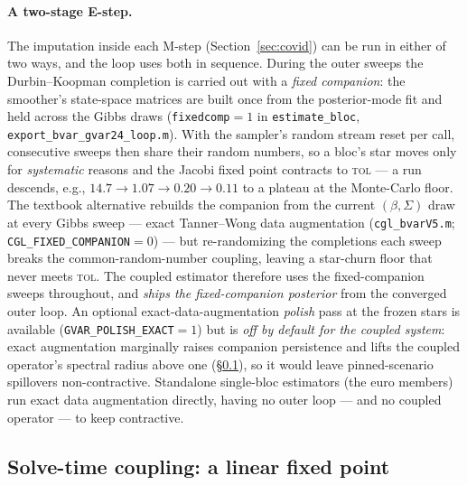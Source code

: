 \documentclass[11pt]{article}
\theoremstyle{plain}
\theoremstyle{remark}
\begin{document}
\paragraph{A two-stage E-step.} The imputation inside each M-step
(Section~\ref{sec:covid}) can be run in either of two ways, and the loop
uses both in sequence. During the outer sweeps the Durbin--Koopman
completion is carried out with a \emph{fixed companion}: the smoother's
state-space matrices are built once from the posterior-mode fit and held
across the Gibbs draws (\texttt{fixedcomp}$=1$ in
\texttt{estimate\_bloc}, \texttt{export\_bvar\_gvar24\_loop.m}). With the
sampler's random stream reset per call, consecutive sweeps then share
their random numbers, so a bloc's star moves only for \emph{systematic}
reasons and the Jacobi fixed point contracts to \textsc{tol} --- a run
descends, e.g., $14.7 \to 1.07 \to 0.20 \to 0.11$ to a plateau at the
Monte-Carlo floor. The textbook alternative rebuilds the companion from
the current $(\beta,\Sigma)$ draw at every Gibbs sweep --- exact
Tanner--Wong data augmentation (\texttt{cgl\_bvarV5.m};
\texttt{CGL\_FIXED\_COMPANION}${=}0$) --- but re-randomizing the
completions each sweep breaks the common-random-number coupling, leaving
a star-churn floor that never meets \textsc{tol}. The coupled estimator
therefore uses the fixed-companion sweeps throughout, and \emph{ships the
fixed-companion posterior} from the converged outer loop. An optional
exact-data-augmentation \emph{polish} pass at the frozen stars is available
(\texttt{GVAR\_POLISH\_EXACT}${=}1$) but is \emph{off by default for the
coupled system}: exact augmentation marginally raises companion persistence
and lifts the coupled operator's spectral radius above one
(\S\ref{sec:coupling}), so it would leave pinned-scenario spillovers
non-contractive. Standalone single-bloc estimators (the euro members) run
exact data augmentation directly, having no outer loop --- and no coupled
operator --- to keep contractive.

\subsection{Solve-time coupling: a linear fixed point}\label{sec:coupling}
\end{document}
